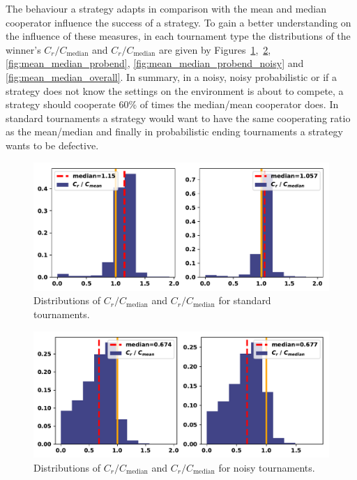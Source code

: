 \documentclass{article}
\begin{document}
The behaviour a strategy adapts in comparison with the mean and median
cooperator influence the success of a strategy. To gain a better understanding on
the influence of these measures, in each tournament type the distributions of
the winner's \(C_r / C_{\text{median}}\) and \(C_r / C_{\text{median}}\)
are given by Figures~\ref{fig:mean_median_std},~\ref{fig:mean_median_noisy},
\ref{fig:mean_median_probend}, \ref{fig:mean_median_probend_noisy} and
\ref{fig:mean_median_overall}. In summary, in a noisy, noisy probabilistic 
or if a strategy does not know the settings on the environment is about to compete,
a strategy should cooperate 60\% of times the median/mean cooperator does. In
standard tournaments a strategy would want to have the same cooperating ratio
as the mean/median and finally in probabilistic ending tournaments a strategy
wants to be defective.

\begin{figure}[!htbp]
    \centering
    \includegraphics[width=.7\textwidth]{../images/compared_to_mean_median_standard.pdf}
    \caption{Distributions of \(C_r / C_{\text{median}}\)
    and \(C_r / C_{\text{median}}\) for standard tournaments.}\label{fig:mean_median_std}
\end{figure}

\begin{figure}[!htbp]
    \centering
    \includegraphics[width=.7\textwidth]{../images/compared_to_mean_median_noisy.pdf}
    \caption{Distributions of \(C_r / C_{\text{median}}\)
    and \(C_r / C_{\text{median}}\) for noisy tournaments.}\label{fig:mean_median_noisy}
\end{figure}
\end{document}

